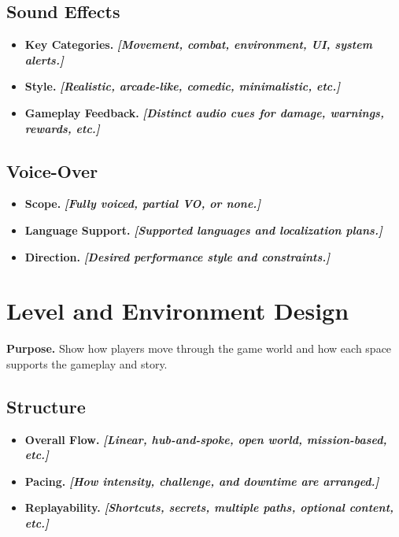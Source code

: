 \documentclass[12pt]{article}
\newcommand{\placeholder}[1]{\textbf{\textit{[#1]}}}
\begin{document}
\subsection{Sound Effects}

\begin{itemize}
    \item \textbf{Key Categories.} \placeholder{Movement, combat, environment, UI, system alerts.}
    \item \textbf{Style.} \placeholder{Realistic, arcade-like, comedic, minimalistic, etc.}
    \item \textbf{Gameplay Feedback.} \placeholder{Distinct audio cues for damage, warnings, rewards, etc.}
\end{itemize}

\subsection{Voice-Over}

\begin{itemize}
    \item \textbf{Scope.} \placeholder{Fully voiced, partial VO, or none.}
    \item \textbf{Language Support.} \placeholder{Supported languages and localization plans.}
    \item \textbf{Direction.} \placeholder{Desired performance style and constraints.}
\end{itemize}

\section{Level and Environment Design}

\textbf{Purpose.} Show how players move through the game world and how each space supports the
gameplay and story.

\subsection{Structure}

\begin{itemize}
    \item \textbf{Overall Flow.} \placeholder{Linear, hub-and-spoke, open world, mission-based, etc.}
    \item \textbf{Pacing.} \placeholder{How intensity, challenge, and downtime are arranged.}
    \item \textbf{Replayability.} \placeholder{Shortcuts, secrets, multiple paths, optional content, etc.}
\end{itemize}
\end{document}
